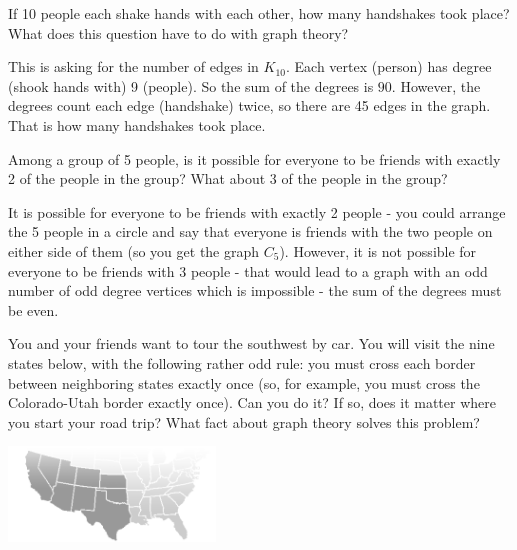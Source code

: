 
\begin{questions}

\question If 10 people each shake hands with each other, how many handshakes took place?  What does this question have to do with graph theory?

	\begin{answer}
		This is asking for the number of edges in $K_{10}$.  Each vertex (person) has degree (shook hands with) 9 (people).  So the sum of the degrees is $90$.  However, the degrees count each edge (handshake) twice, so there are 45 edges in the graph.  That is how many handshakes took place.%
	\end{answer}
	
	
	

\question Among a group of 5 people, is it possible for everyone to be friends with exactly 2 of the people in the group?  What about 3 of the people in the group?

	\begin{answer}
		It is possible for everyone to be friends with exactly 2 people - you could arrange the 5 people in a circle and say that everyone is friends with the two people on either side of them (so you get the graph $C_5$).  However, it is not possible for everyone to be friends with 3 people - that would lead to a graph with an odd number of odd degree vertices which is impossible - the sum of the degrees must be even.  %
	\end{answer}
	
	
	


\question You and your friends want to tour the southwest by car.  You will visit the nine states below, with the following rather odd rule: you must cross each border between neighboring states exactly once (so, for example, you must cross the Colorado-Utah border exactly once).  Can you do it?  If so, does it matter where you start your road trip?  What fact about graph theory solves this problem?

\centerline{\includegraphics[height=1in]{images/southwest_map.png}}



\end{questions}
